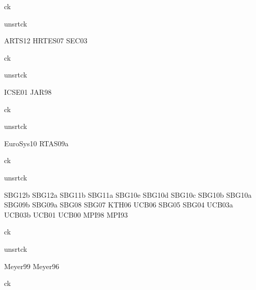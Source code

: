 {ck}{}


{unsrtck}

\nocite{chapters}{ARTS12}
\nocite{chapters}{HRTES07}
\nocite{chapters}{SEC03}

{ck}{}


{unsrtck}

\nocite{systems}{ICSE01}
\nocite{systems}{JAR98}

{ck}{}


{unsrtck}

\nocite{posters}{EuroSys10}
\nocite{posters}{RTAS09a}

{ck}{}


{unsrtck}

\nocite{reports}{SBG12b}
\nocite{reports}{SBG12a}
\nocite{reports}{SBG11b}
\nocite{reports}{SBG11a}
\nocite{reports}{SBG10e}
\nocite{reports}{SBG10d}
\nocite{reports}{SBG10c}
\nocite{reports}{SBG10b}
\nocite{reports}{SBG10a}
\nocite{reports}{SBG09b}
\nocite{reports}{SBG09a}
\nocite{reports}{SBG08}
\nocite{reports}{SBG07}
\nocite{reports}{KTH06}
\nocite{reports}{UCB06}
\nocite{reports}{SBG05}
\nocite{reports}{SBG04}
\nocite{reports}{UCB03a}
\nocite{reports}{UCB03b}
\nocite{reports}{UCB01}
\nocite{reports}{UCB00}
\nocite{reports}{MPI98}
\nocite{reports}{MPI93}

{ck}{}


{unsrtck}

\nocite{theses}{Meyer99}
\nocite{theses}{Meyer96}

{ck}{}


